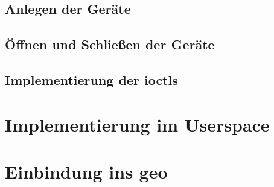 \subsection{Anlegen der Geräte}
\subsection{Öffnen und Schließen der Geräte}
\subsection{Implementierung der \acl{ioctl}s}



\section{Implementierung im Userspace}\label{sec:user}


\section{Einbindung ins \acl{geo}}\label{sec:soft}











